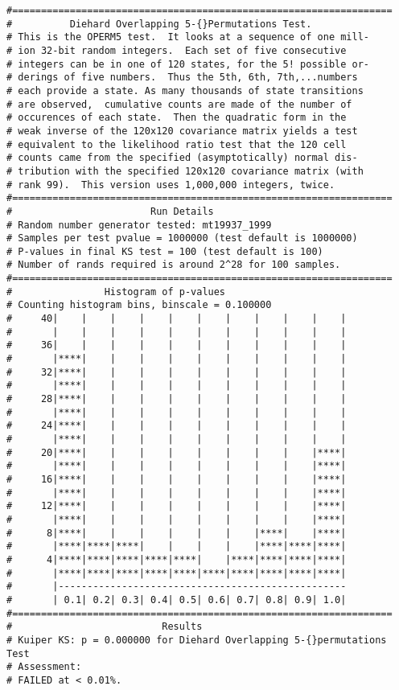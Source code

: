 \documentclass[12pt]{book}
\begin{document}
\begin{verbatim}
#==================================================================
#          Diehard Overlapping 5-{}Permutations Test.
# This is the OPERM5 test.  It looks at a sequence of one mill- 
# ion 32-bit random integers.  Each set of five consecutive     
# integers can be in one of 120 states, for the 5! possible or- 
# derings of five numbers.  Thus the 5th, 6th, 7th,...numbers   
# each provide a state. As many thousands of state transitions  
# are observed,  cumulative counts are made of the number of    
# occurences of each state.  Then the quadratic form in the     
# weak inverse of the 120x120 covariance matrix yields a test   
# equivalent to the likelihood ratio test that the 120 cell     
# counts came from the specified (asymptotically) normal dis-   
# tribution with the specified 120x120 covariance matrix (with  
# rank 99).  This version uses 1,000,000 integers, twice.       
#==================================================================
#                        Run Details
# Random number generator tested: mt19937_1999
# Samples per test pvalue = 1000000 (test default is 1000000)
# P-values in final KS test = 100 (test default is 100)
# Number of rands required is around 2^28 for 100 samples.
#==================================================================
#                Histogram of p-values
# Counting histogram bins, binscale = 0.100000
#     40|    |    |    |    |    |    |    |    |    |    |
#       |    |    |    |    |    |    |    |    |    |    |
#     36|    |    |    |    |    |    |    |    |    |    |
#       |****|    |    |    |    |    |    |    |    |    |
#     32|****|    |    |    |    |    |    |    |    |    |
#       |****|    |    |    |    |    |    |    |    |    |
#     28|****|    |    |    |    |    |    |    |    |    |
#       |****|    |    |    |    |    |    |    |    |    |
#     24|****|    |    |    |    |    |    |    |    |    |
#       |****|    |    |    |    |    |    |    |    |    |
#     20|****|    |    |    |    |    |    |    |    |****|
#       |****|    |    |    |    |    |    |    |    |****|
#     16|****|    |    |    |    |    |    |    |    |****|
#       |****|    |    |    |    |    |    |    |    |****|
#     12|****|    |    |    |    |    |    |    |    |****|
#       |****|    |    |    |    |    |    |    |    |****|
#      8|****|    |    |    |    |    |    |****|    |****|
#       |****|****|****|    |    |    |    |****|****|****|
#      4|****|****|****|****|****|    |****|****|****|****|
#       |****|****|****|****|****|****|****|****|****|****|
#       |--------------------------------------------------
#       | 0.1| 0.2| 0.3| 0.4| 0.5| 0.6| 0.7| 0.8| 0.9| 1.0|
#==================================================================
#                          Results
# Kuiper KS: p = 0.000000 for Diehard Overlapping 5-{}permutations Test
# Assessment:
# FAILED at < 0.01%.


\end{verbatim}
\end{document}

